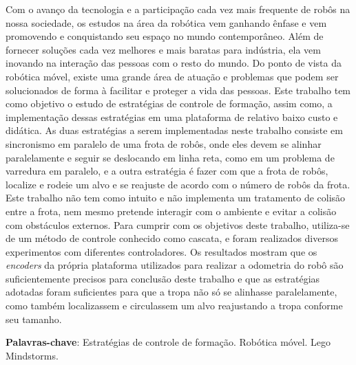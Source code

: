 %
%

\begin{resumo}

Com o avanço da tecnologia e a participação cada vez mais frequente de robôs na nossa sociedade, os estudos na área da robótica vem ganhando ênfase e vem promovendo e conquistando seu espaço no mundo contemporâneo. Além de fornecer soluções cada vez melhores e mais baratas para indústria, ela vem inovando na interação das pessoas com o resto do mundo. Do ponto de vista da robótica móvel, existe uma grande área de atuação e problemas que podem ser solucionados de forma à facilitar e proteger a vida das pessoas. Este trabalho tem como objetivo o estudo de estratégias de controle de formação, assim como, a implementação dessas estratégias em uma plataforma de relativo baixo custo e didática. As duas estratégias a serem implementadas neste trabalho consiste em sincronismo em paralelo de uma frota de robôs, onde eles devem se alinhar paralelamente e seguir se deslocando em linha reta, como em um problema de varredura em paralelo, e a outra estratégia é fazer com que a frota de robôs, localize e rodeie um alvo e se reajuste de acordo com o número de robôs da frota. Este trabalho não tem como intuito e não implementa um tratamento de colisão entre a frota, nem mesmo pretende interagir com o ambiente e evitar a  colisão com obstáculos externos. Para cumprir com os objetivos deste trabalho, utiliza-se de um método de controle conhecido como cascata, e foram realizados diversos experimentos com diferentes controladores. Os resultados mostram que os \emph{encoders} da própria plataforma utilizados para realizar a odometria do robô são suficientemente precisos para conclusão deste trabalho e que as estratégias adotadas foram suficientes para que a tropa não só se alinhasse paralelamente, como também localizassem e circulassem um alvo reajustando a tropa conforme seu tamanho.

\textbf{Palavras-chave}: Estratégias de controle de formação. Robótica móvel. Lego Mindstorms. 
\end{resumo}
